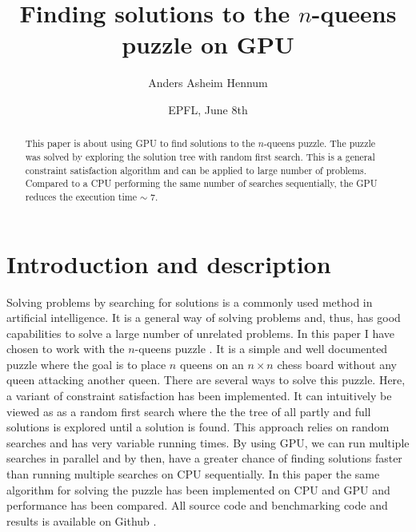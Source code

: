 \documentclass{article}
\title{Finding solutions to the $n$-queens puzzle on GPU}
\author{Anders Asheim Hennum}
\date{EPFL, June 8th}
\begin{document}
\maketitle

\begin{abstract}
This paper is about using GPU to find solutions to the $n$-queens puzzle. The puzzle was
solved by exploring the solution tree with random first search. This is a general constraint
satisfaction algorithm and can be applied to large number of problems. Compared to a CPU performing
the same number of searches sequentially, the GPU reduces the execution time $\sim$ 7.

\end{abstract}

\section{Introduction and description}

Solving problems by searching for solutions is a commonly used method in artificial intelligence. 
It is a general way of solving problems and, thus, has good capabilities to solve a large number of unrelated problems. 
In this paper I have chosen to work with the $n$-queens puzzle \cite{nqueen}. 
It is a simple and well documented puzzle where the goal is to place $n$ queens on an $n \times n$ chess
board without any queen attacking another queen. There are several ways to solve this puzzle. Here, a variant 
of constraint satisfaction \cite{constraint} has been implemented. It can intuitively be viewed as as a random first search where
the the tree of all partly and full solutions is explored until a solution is found.  
This approach relies on random searches and has very variable running times.
By using GPU, we can run multiple searches in parallel and by then, have a greater chance of finding
solutions faster than running multiple searches on CPU sequentially. In this paper the same algorithm for solving the 
puzzle has been implemented on CPU and GPU and performance has been compared. All source code and benchmarking code and results
is available on Github \cite{github}.
\end{document}

